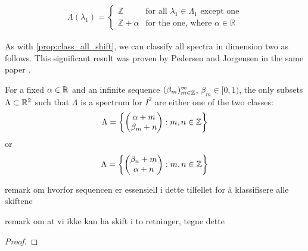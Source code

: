 \documentclass[../thesis.tex]{subfiles}
\begin{document}
\begin{align*}
    \Lambda(\lambda_1) = \begin{cases}        
        \mathbb{Z} & \text{for all } \lambda_1 \in \Lambda_1 \text{ except one}\\        
        \mathbb{Z}+\alpha & \text{for the one, where } \alpha \in \mathbb{R}   
    \end{cases}
\end{align*}

As with \cref{prop:class_all_shift}, we can classify all spectra in dimension two as follows. This significant result was proven by Pedersen and Jorgensen in the same paper \cite{jorgensenSpectralPairsCartesian2001}. 

\begin{theorem}\label{thrm:class_all_shift_2d}
    For a fixed $\alpha \in \mathbb{R}$ and an infinite sequence $(\beta_m)_{m\in \mathbb{Z}}^\infty$, $\beta_m \in [0,1)$, the only subsets $\Lambda \subset \mathbb{R}^2$ such that $\Lambda$ is a spectrum for $I^2$ are either one of the two classes:
    \begin{equation}
        \Lambda = \left\{
            \begin{pmatrix}
            \alpha + m\\
            \beta_m + n
            \end{pmatrix} : m,n \in  \mathbb{Z}
            \right\}
    \end{equation}
    or
    \begin{equation}
        \Lambda = \left\{
            \begin{pmatrix}
            \beta_n + m\\
            \alpha + n
            \end{pmatrix} : m,n \in  \mathbb{Z}
            \right\}
    \end{equation}
\end{theorem}

remark om hvorfor sequencen er essensiell i dette tilfellet for å klassifisere alle skiftene %


remark om at vi ikke kan ha skift i to retninger, tegne dette

\begin{proof}
    
\end{proof}
\end{document}
